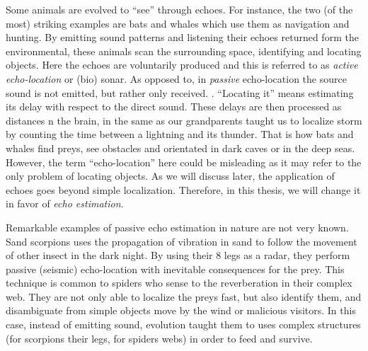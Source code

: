 \mynewline
Some animals are evolved to ``see'' through echoes.
For instance, the two (of the most) striking examples are bats and whales which use them as navigation and hunting.
By emitting sound patterns and listening their echoes returned form the environmental, these animals scan the surrounding space, identifying and locating objects.
Here the echoes are voluntarily produced and this is referred to as \textit{active echo-location} or (bio) sonar.
As opposed to, in \textit{passive} echo-location the source sound is not emitted, but rather only received.
.
``Locating it'' means estimating its delay with respect to the direct sound.
These delays are then processed as distances n the brain, in the same as our grandparents taught us to localize storm by counting the time between a lightning and its thunder.
That is how bats and whales find preys, see obstacles and orientated in dark caves or in the deep seas.
However, the term ``echo-location'' here could be misleading as it may refer to the only problem of locating objects.
As we will discuss later, the application of echoes goes beyond simple localization.
Therefore, in this thesis, we will change it in favor of \textit{echo estimation}.

\mynewline
Remarkable examples of passive echo estimation in nature are not very known.
Sand scorpions uses the propagation of vibration in sand to follow the movement of other insect in the dark night.
By using their 8 legs as a radar, they perform passive (seismic) echo-location with inevitable consequences for the prey.
This technique is common to spiders who sense to the reverberation in their complex web.
They are not only able to localize the preys fast, but also identify them, and disambiguate from simple objects move by the wind or malicious visitors.
In this case, instead of emitting sound, evolution taught them to uses complex structures (for scorpions their legs, for spiders webs) in order to feed and survive.

